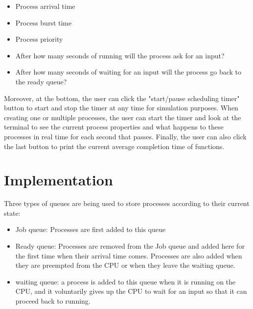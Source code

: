 \documentclass{article}
\begin{document}
\begin{itemize}
    \item Process arrival time
    \item Process burst time
    \item Process priority
    \item After how many seconds of running will the process ask for an input?
    \item After how many seconds of waiting for an input will the process go back to the ready queue?
\end{itemize}

Moreover, at the bottom, the user can click the "start/pause scheduling timer" button to start and stop the timer at any time for simulation purposes. When creating one or multiple processes, the user can start the timer and look at the terminal to see the current process properties and what happens to these processes in real time for each second that passes. Finally, the user can also click the last button to print the current average completion time of functions.

\section{Implementation}

Three types of queues are being used to store processes according to their current state:

\begin{itemize}
    \item Job queue: Processes are first added to this queue
    \item Ready queue: Processes are removed from the Job queue and added here for the first time when their arrival time comes. Processes are also added when they are preempted from the CPU or when they leave the waiting queue.
    \item waiting queue: a process is added to this queue when it is running on the CPU, and it voluntarily gives up the CPU to wait for an input so that it can proceed back to running.
\end{itemize}
\end{document}
